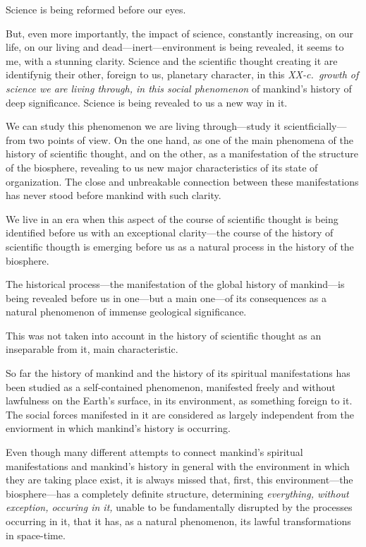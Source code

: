 Science is being reformed before our eyes.

But, even more importantly, the impact of science, constantly increasing, on
our life, on our living and dead---inert---environment is being revealed, it
seems to me, with a stunning clarity.  Science and the scientific thought
creating it are identifynig their other, foreign to us, planetary character, in
this \emph{XX-c.\ growth of science we are living through, in this social
phenomenon} of mankind's history of deep significance.  Science is being
revealed to us a new way in it.

We can study this phenomenon we are living through---study it
scientficially---from two points of view.  On the one hand, as one of the main
phenomena of the history of scientific thought, and on the other, as a
manifestation of the structure of the biosphere, revealing to us new major
characteristics of its state of organization.
The close and unbreakable connection between these manifestations has never
stood before mankind with such clarity.

We live in an era when this aspect of the course of scientific thought is being
identified before us with an exceptional clarity---the course of the history of
scientific thougth is emerging before us as a natural process in the history of
the biosphere.

The historical process---the manifestation of the global history of
mankind---is being revealed before us in one---but a main one---of its
consequences as a natural phenomenon of immense geological significance.

This was not taken into account in the history of scientific thought as an
inseparable from it, main characteristic.


\Section %
So far the history of mankind and the history of its spiritual manifestations
has been studied as a self-contained phenomenon, manifested freely and without
lawfulness on the Earth's surface, in its environment, as something foreign to
it.  The social forces manifested in it are considered as largely independent
from the enviorment in which mankind's history is occurring.

Even though many different attempts to connect mankind's spiritual
manifestations and mankind's history in general with the environment in which
they are taking place exist, it is always missed that, first, this
environment---the biosphere---has a completely definite structure, determining
\emph{everything, without exception, occuring in it, }unable to be
fundamentally disrupted by the processes occurring in it, that it has, as a
natural phenomenon, its lawful transformations in space-time.


